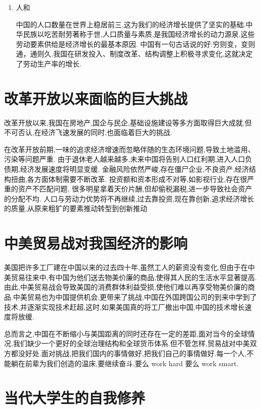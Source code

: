 \documentclass[UTF8]{ctexart} %
\begin{document}
{{\begin{enumerate}

中国地大物博,能源丰富,环境合适,劳动力成本低廉.这为我国的经济增长提供了很好的发展环境.

\item 人和

中国的人口数量在世界上稳居前三,这为我们的经济增长提供了坚实的基础.中华民族以吃苦耐劳著称于世,人口质量与素质,是我国经济增长的动力源泉.这些劳动要素供给是经济增长的最基本原因.
中国有一句古话说的好:穷则变，变则通，通则久.我国在研发投入、制度改革、结构调整上积极寻求变化,这就决定了劳动生产率的增长.
\end  {enumerate}

\section{改革开放以来面临的巨大挑战}

改革开放以来,我国在房地产,国企与民企,基础设施建设等多方面取得巨大成就.但不可否认,在经济飞速发展的同时,也面临着巨大的挑战.

在改革开放前期,一味的追求经济增速而忽略伴随的生态环境问题,导致土地滥用、污染等问题严重.
由于退休老人越来越多,未来中国将告别人口红利期,进入人口负债期,经济发展速度将明显变缓.
金融风险依然严峻,存在僵尸企业,不良资产,经济结构扭曲,各方面体制需要不断改革.
投资额和资本形成不对等,如影视行业,存在很严重的资产不匹配问题,
很多明星拿着天价片酬,但却偷税漏税,进一步导致社会资产的分配不均.
人口与劳动力优势将不再继续,过去靠投资,现在靠创新,追求经济增长的质量,从原来粗犷的要素推动转型到创新推动
	
\section{中美贸易战对我国经济的影响}

美国把许多工厂建在中国以来的过去四十年,虽然工人的薪资没有变化,但由于在中美贸易往来中,有中国为他们送去物美价廉的商品,使得其人民的生活水平显著提高.由此,中美贸易战会导致美国的消费群体利益受损,使他们难以再享受物美价廉的商品.中美贸易也为中国提供机会,更带来了挑战,中国在外国跨国公司的到来中学到了技术,并逐渐实现技术赶超,这时,如果美国真的将工厂撤出中国,中国的技术增长速度将放缓.

总而言之,中国在不断缩小与美国距离的同时还存在一定的差距,面对当今的全球情况,我们缺少一个更好的全球治理结构和全球货币体系.但不管怎样,贸易战对中美双方都没好处.面对挑战,把我们国内的事情做好,把我们自己的事情做好.每一个人,不能躺在前辈为我们创造的温床,要继续奋斗,要么 work hard 要么 work smart.

\section{当代大学生的自我修养}

}}
\end{document}
